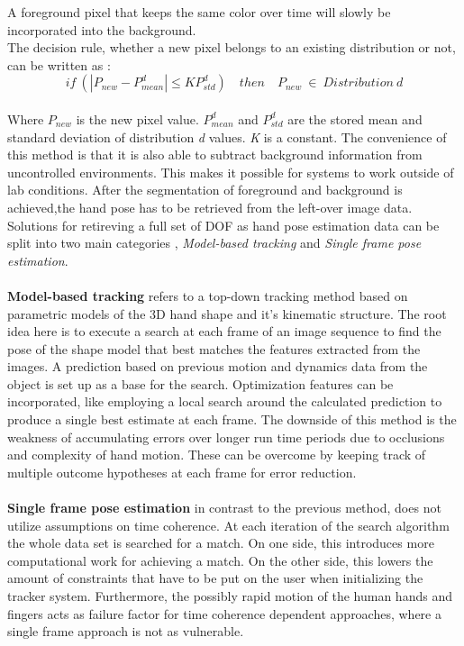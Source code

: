 A foreground pixel that keeps the same color over time will slowly be incorporated into the background.\\
The decision rule, whether a new pixel belongs to an existing distribution or not, can be written as \cite{Kristensen.Feb.2007}:\\
\begin{equation}
 if\ (|P_{new} −P^{d}_{mean}|\leq KP^{d}_{std})\quad then \quad P_{new}\  \in\ Distribution\ d
\end{equation}
\\Where $P_{new}$ is the new pixel value. $P^{d}_{mean}$ and $P^{d}_{std}$ are the stored mean and standard deviation of distribution \textit{d} values. \textit{K} is a constant. The convenience of this method is that it is also able to subtract background information from uncontrolled environments. This makes it possible for systems to work outside of lab conditions.
After the segmentation of foreground and background is achieved,the hand pose has to be retrieved from the left-over image data. Solutions for retireving a full set of DOF as hand pose estimation data can be split into two main categories \cite{Erol.2007}, \textit{Model-based tracking} and \textit{Single frame pose estimation}.\\\\
\textbf{Model-based tracking} refers to a top-down tracking method based on parametric models of the 3D hand shape and it's kinematic structure. The root idea here is to execute a search at each frame of an image sequence to find the pose of the shape model that best matches the features extracted from the images. A prediction based on previous motion and dynamics data from the object is set up as a base for the search. Optimization features can be incorporated, like employing a local search around the calculated prediction to produce a single best estimate at each frame. The downside of this method is the weakness of accumulating errors over longer run time periods due to occlusions and complexity of hand motion. These can be overcome by keeping track of multiple outcome hypotheses at each frame for error reduction.
\\\\
\textbf{Single frame pose estimation} in contrast to the previous method, does not utilize assumptions on time coherence. At each iteration of the search algorithm the whole data set is searched for a match.  On one side, this introduces more computational work for achieving a match. On the other side, this lowers the amount of constraints that have to be put on the user when initializing the tracker system. Furthermore, the possibly rapid motion of the human hands and fingers acts as failure factor for time coherence dependent approaches, where a single frame approach is not as vulnerable.
